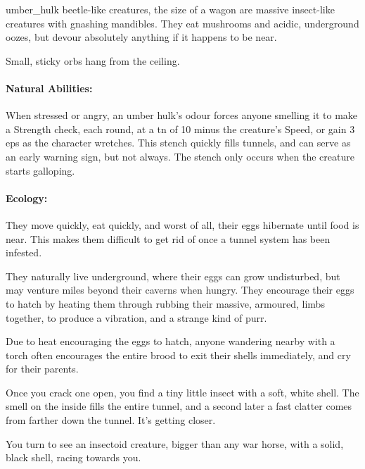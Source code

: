 \begin{multicols}{2}
\sporeFolk

\sporeFolk

\sporeFolk

  {umber_hulk}%
  {beetle-like creatures, the size of a wagon}%
are massive insect-like creatures with gnashing mandibles.
They eat mushrooms and acidic, underground oozes, but devour absolutely anything if it happens to be near.

\begin{boxtext}
  Small, sticky orbs hang from the ceiling.
\end{boxtext}

\paragraph{Natural Abilities:} When stressed or angry, an umber hulk's odour forces anyone smelling it to make a Strength check, each round, at a \gls{tn} of 10 minus the creature's Speed, or gain 3 \glspl{ep} as the character wretches.
This stench quickly fills tunnels, and can serve as an early warning sign, but not always.
The stench only occurs when the creature starts galloping.

\paragraph{Ecology:}
They move quickly, eat quickly, and worst of all, their eggs hibernate until food is near.
This makes them difficult to get rid of once a tunnel system has been infested.

They naturally live underground, where their eggs can grow undisturbed, but may venture miles beyond their caverns when hungry.
They encourage their eggs to hatch by heating them through rubbing their massive, armoured, limbs together, to produce a vibration, and a strange kind of purr.

Due to heat encouraging the eggs to hatch, anyone wandering nearby with a torch often encourages the entire brood to exit their shells immediately, and cry for their parents.

\begin{boxtext}
  Once you crack one open, you find a tiny little insect with a soft, white shell.
  The smell on the inside fills the entire tunnel, and a second later a fast clatter comes from farther down the tunnel.
  It's getting closer.

  You turn to see an insectoid creature, bigger than any war horse, with a solid, black shell, racing towards you.
\end{boxtext}


\end{multicols}
